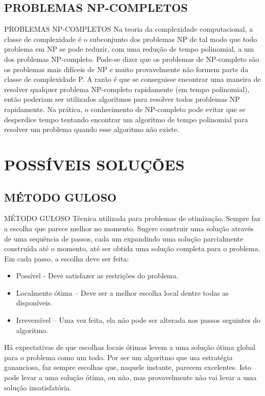 \documentclass[	english,			%
	brazil,]{beamer}
\begin{document}
\subsection{PROBLEMAS NP-COMPLETOS}
\begin{frame}{PROBLEMAS NP-COMPLETOS}
	Na teoria da complexidade computacional, a classe de complexidade é o subconjunto dos problemas NP de tal modo que todo problema em NP se pode reduzir, com uma redução de tempo polinomial, a um dos problemas NP-completo. Pode-se dizer que os problemas de NP-completo são os problemas mais difíceis de NP e muito provavelmente não formem parte da classe de complexidade P. 
	A razão é que se conseguisse encontrar uma maneira de resolver qualquer problema NP-completo rapidamente (em tempo polinomial), então poderiam ser utilizados algoritmos para resolver todos problemas NP rapidamente. Na prática, o conhecimento de NP-completo pode evitar que se desperdice tempo tentando encontrar um algoritmo de tempo polinomial para resolver um problema quando esse algoritmo não existe.
	
\end{frame}

\section{POSSÍVEIS SOLUÇÕES}

\subsection{MÉTODO GULOSO}
\begin{frame}{MÉTODO GULOSO}
	Técnica utilizada para problemas de otimização. Sempre faz a escolha que parece melhor no momento. Sugere construir uma solução através de uma sequência de passos, cada um expandindo uma solução parcialmente construída até o momento, até ser obtida uma solução completa para o problema.
	Em cada passo, a escolha deve ser feita: 
	\begin{itemize}
		\item Possível - Deve satisfazer as restrições do problema.
		\item Localmente ótima – Deve ser a melhor escolha local dentre todas as disponíveis.
		\item Irreversível – Uma vez feita, ela não pode ser alterada nos passos seguintes do algoritmo.
	\end{itemize}
	Há expectativas de que escolhas locais ótimas levem a uma solução ótima global para o problema como um todo. Por ser um algoritmo que usa estratégia gananciosa, faz sempre escolhas que, naquele instante, parecem excelentes. Isto pode levar a uma solução ótima, ou não, mas provavelmente não vai levar a uma solução insatisfatória.
\end{frame}
\end{document}
